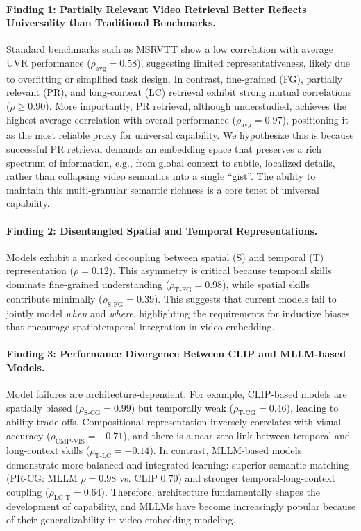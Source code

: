 \paragraph{Finding 1: Partially Relevant Video Retrieval Better Reflects Universality than Traditional Benchmarks.}
Standard benchmarks such as MSRVTT show a low correlation with average UVR performance ($\rho_{\text{avg}} = 0.58$), suggesting limited representativeness, likely due to overfitting or simplified task design. In contrast, fine-grained (FG), partially relevant (PR), and long-context (LC) retrieval exhibit strong mutual correlations ($\rho \geq 0.90$). More importantly, PR retrieval, although understudied, achieves the highest average correlation with overall performance ($\rho_{\text{avg}} = 0.97$), positioning it as the most reliable proxy for universal capability. We hypothesize this is because successful PR retrieval demands an embedding space that preserves a rich spectrum of information, e.g., from global context to subtle, localized details, rather than collapsing video semantics into a single ``gist''. The ability to maintain this multi-granular semantic richness is a core tenet of universal capability.

\paragraph{Finding 2: Disentangled Spatial and Temporal Representations.}
Models exhibit a marked decoupling between spatial (S) and temporal (T) representation ($\rho = 0.12$). This asymmetry is critical because temporal skills dominate fine-grained understanding ($\rho_{\text{T-FG}} = 0.98$), while spatial skills contribute minimally ($\rho_{\text{S-FG}} = 0.39$). This suggests that current models fail to jointly model \textit{when} and \textit{where}, highlighting the requirements for inductive biases that encourage spatiotemporal integration in video embedding.

\paragraph{Finding 3: Performance Divergence Between CLIP and MLLM-based Models.}
Model failures are architecture-dependent. For example, CLIP-based models are spatially biased ($\rho_{\text{S-CG}} = 0.99$) but temporally weak ($\rho_{\text{T-CG}} = 0.46$), leading to ability trade-offs. Compositional representation inversely correlates with visual accuracy ($\rho_{\text{CMP-VIS}} = -0.71$), and there is a near-zero link between temporal and long-context skills ($\rho_{\text{T-LC}} = -0.14$). In contrast, MLLM-based models demonstrate more balanced and integrated learning: superior semantic matching (PR-CG: MLLM $\rho = 0.98$ vs. CLIP $0.70$) and stronger temporal-long-context coupling ($\rho_{\text{LC-T}} = 0.64$). Therefore, architecture fundamentally shapes the development of capability, and MLLMs have become increasingly popular because of their generalizability in video embedding modeling.

